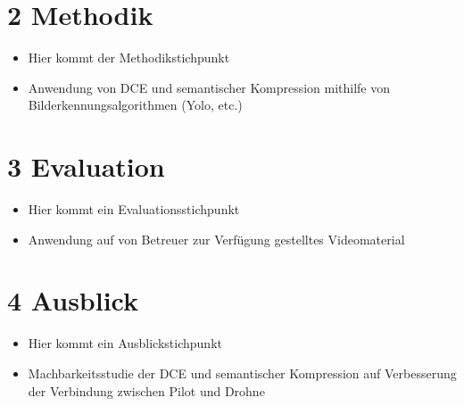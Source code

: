 \documentclass[a4paper,11pt,pdftex]{scrreport}
\begin{document}
\section*{2 Methodik}
\begin{itemize}
    \item Hier kommt der Methodikstichpunkt
    \item Anwendung von DCE und semantischer Kompression mithilfe von Bilderkennungsalgorithmen (Yolo, etc.)
    

\end{itemize}



\section*{3 Evaluation}
\begin{itemize}
    \item Hier kommt ein Evaluationsstichpunkt
    \item Anwendung auf von Betreuer zur Verfügung gestelltes Videomaterial
\end{itemize}


\section*{4 Ausblick}
\begin{itemize}
    \item Hier kommt ein Ausblickstichpunkt
    \item Machbarkeitsstudie der DCE und semantischer Kompression auf Verbesserung der Verbindung zwischen Pilot und Drohne
\end{itemize}

\appendix

 


\setcounter{page}{1}
\end{document}
